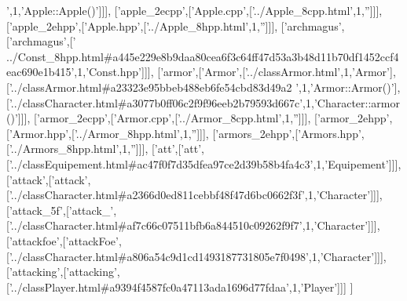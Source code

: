 \begin{DoxyCode}
{      '},1,\textcolor{stringliteral}{'Apple::Apple()'}]]],
  [\textcolor{stringliteral}{'apple\_2ecpp'},[\textcolor{stringliteral}{'Apple.cpp'},[\textcolor{stringliteral}{'../Apple\_8cpp.html'},1,\textcolor{stringliteral}{''}]]],
  [\textcolor{stringliteral}{'apple\_2ehpp'},[\textcolor{stringliteral}{'Apple.hpp'},[\textcolor{stringliteral}{'../Apple\_8hpp.html'},1,\textcolor{stringliteral}{''}]]],
  [\textcolor{stringliteral}{'archmagus'},[\textcolor{stringliteral}{'archmagus'},[\textcolor{stringliteral}{'
      ../Const\_8hpp.html#a445e229e8b9daa80cea6f3c64ff47d53a3b48d11b70df1452ccf4eac690e1b415'},1,\textcolor{stringliteral}{'Const.hpp'}]]],
  [\textcolor{stringliteral}{'armor'},[\textcolor{stringliteral}{'Armor'},[\textcolor{stringliteral}{'../classArmor.html'},1,\textcolor{stringliteral}{'Armor'}],[\textcolor{stringliteral}{'../classArmor.html#a23323e95bbeb488eb6fe54cbd83d49a2
      '},1,\textcolor{stringliteral}{'Armor::Armor()'}],[\textcolor{stringliteral}{'../classCharacter.html#a3077b0ff06c2f9f96eeb2b79593d667c'},1,\textcolor{stringliteral}{'Character::armor()'}]]],
  [\textcolor{stringliteral}{'armor\_2ecpp'},[\textcolor{stringliteral}{'Armor.cpp'},[\textcolor{stringliteral}{'../Armor\_8cpp.html'},1,\textcolor{stringliteral}{''}]]],
  [\textcolor{stringliteral}{'armor\_2ehpp'},[\textcolor{stringliteral}{'Armor.hpp'},[\textcolor{stringliteral}{'../Armor\_8hpp.html'},1,\textcolor{stringliteral}{''}]]],
  [\textcolor{stringliteral}{'armors\_2ehpp'},[\textcolor{stringliteral}{'Armors.hpp'},[\textcolor{stringliteral}{'../Armors\_8hpp.html'},1,\textcolor{stringliteral}{''}]]],
  [\textcolor{stringliteral}{'att'},[\textcolor{stringliteral}{'att'},[\textcolor{stringliteral}{'../classEquipement.html#ac47f0f7d35dfea97ce2d39b58b4fa4c3'},1,\textcolor{stringliteral}{'Equipement'}]]],
  [\textcolor{stringliteral}{'attack'},[\textcolor{stringliteral}{'attack'},[\textcolor{stringliteral}{'../classCharacter.html#a2366d0ed811cebbf48f47d6bc0662f3f'},1,\textcolor{stringliteral}{'Character'}]]],
  [\textcolor{stringliteral}{'attack\_5f'},[\textcolor{stringliteral}{'attack\_'},[\textcolor{stringliteral}{'../classCharacter.html#af7c66c07511bfb6a844510c09262f9f7'},1,\textcolor{stringliteral}{'Character'}]]],
  [\textcolor{stringliteral}{'attackfoe'},[\textcolor{stringliteral}{'attackFoe'},[\textcolor{stringliteral}{'../classCharacter.html#a806a54c9d1cd1493187731805e7f0498'},1,\textcolor{stringliteral}{'Character'}]]],
  [\textcolor{stringliteral}{'attacking'},[\textcolor{stringliteral}{'attacking'},[\textcolor{stringliteral}{'../classPlayer.html#a9394f4587fc0a47113ada1696d77fdaa'},1,\textcolor{stringliteral}{'Player'}]]]
]
\end{DoxyCode}
